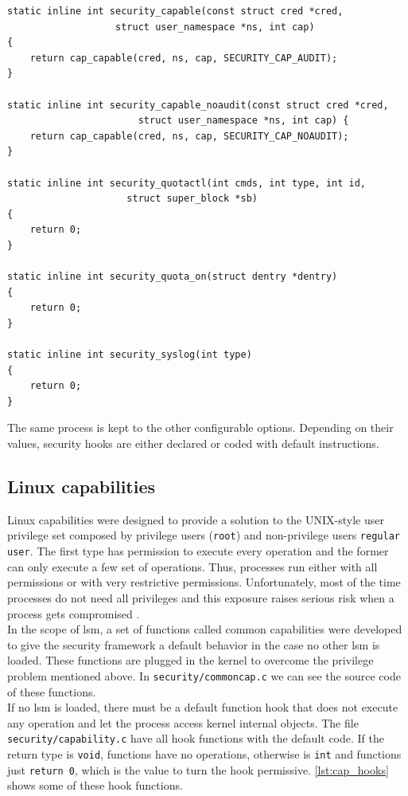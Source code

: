 \begin{lstlisting}[frame=none, numbers=none, caption=Default security functions (Linux kernel v3.11), label=lst:default_hooks]
static inline int security_capable(const struct cred *cred,
				   struct user_namespace *ns, int cap)
{
	return cap_capable(cred, ns, cap, SECURITY_CAP_AUDIT);
}

static inline int security_capable_noaudit(const struct cred *cred,
					   struct user_namespace *ns, int cap) {
	return cap_capable(cred, ns, cap, SECURITY_CAP_NOAUDIT);
}

static inline int security_quotactl(int cmds, int type, int id,
				     struct super_block *sb)
{
	return 0;
}

static inline int security_quota_on(struct dentry *dentry)
{
	return 0;
}

static inline int security_syslog(int type)
{
	return 0;
}
\end{lstlisting}

\noindent
The same process is kept to the other configurable options. Depending on their values, security hooks are either declared or coded with default instructions.

\subsection{Linux capabilities}
\label{sec:linux_capabilities}

Linux capabilities were designed to provide a solution to the UNIX-style user privilege set composed by privilege users (\texttt{root}) and non-privilege users \texttt{regular user}. The first type has permission to execute every operation and the former can only execute a few set of operations. Thus, processes run either with all permissions or with very restrictive permissions. Unfortunately, most of the time processes do not need all privileges and this exposure raises serious risk when a process gets compromised \cite{Wiki:Capabilities}.\\

\noindent
In the scope of \gls{lsm}, a set of functions called common capabilities were developed to give the security framework a default behavior in the case no other \gls{lsm} is loaded. These functions are plugged in the kernel to overcome the privilege problem mentioned above. In \texttt{security/commoncap.c} we can see the source code of these functions.\\

\noindent
If no \gls{lsm} is loaded, there must be a default function hook that does not execute any operation and let the process access kernel internal objects. The file \texttt{security/capability.c} have all hook functions with the default code. If the return type is \texttt{void}, functions have no operations, otherwise is \texttt{int} and functions just \texttt{return 0}, which is the value to turn the hook permissive. \autoref{lst:cap_hooks} shows some of these hook functions.

